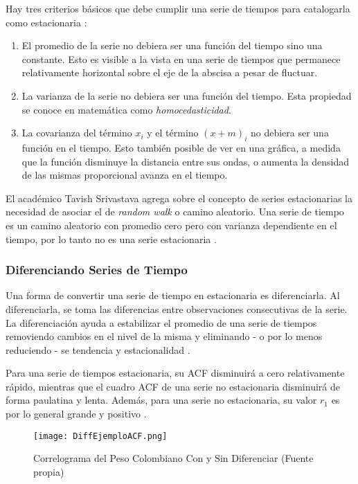 \begin{spacing}{1.5}
Hay tres criterios básicos que debe cumplir una serie de tiempos para catalogarla como estacionaria \cite{srivastava}:

\begin{enumerate}
	\item El promedio de la serie no debiera ser una función del tiempo sino una constante. Esto es visible a la vista en una serie de tiempos que permanece relativamente horizontal sobre el eje de la abscisa a pesar de fluctuar. 
	\item La varianza de la serie no debiera ser una función del tiempo. Esta propiedad se conoce en matemática como \emph{homocedasticidad}.
    \item La covarianza del término $x_i$ y el término $(x + m)_i$ no debiera ser una función en el tiempo. Esto también posible de ver en una gráfica, a medida que la función disminuye la distancia entre sus ondas, o aumenta la densidad de las mismas proporcional avanza en el tiempo. 
\end{enumerate}

El académico Tavish Srivastava agrega sobre el concepto de series estacionarias la necesidad de asociar el de \emph{random walk} o camino aleatorio. Una serie de tiempo es un camino aleatorio con promedio cero pero con varianza dependiente en el tiempo, por lo tanto no es una serie estacionaria \cite{srivastava}.

\subsubsection{Diferenciando Series de Tiempo}
Una forma de convertir una serie de tiempo en estacionaria es diferenciarla. Al diferenciarla, se toma las diferencias entre observaciones consecutivas de la serie. La diferenciación ayuda a estabilizar el promedio de una serie de tiempos removiendo cambios en el nivel de la misma y eliminando - o por lo menos reduciendo - se tendencia y estacionalidad \cite{hyndman}. 

Para una serie de tiempos estacionaria, su ACF disminuirá a cero relativamente rápido, mientras que el cuadro ACF de una serie no estacionaria disminuirá de forma paulatina y lenta. Además, para una serie no estacionaria, su valor $r_1$ es por lo general grande y positivo \cite{hyndman}.

\begin{figure}[h!]
    \centering
    \texttt{[image: DiffEjemploACF.png]}
    \caption{Correlograma del Peso Colombiano Con y Sin Diferenciar (Fuente propia)}
\end{figure}


\end{spacing}
